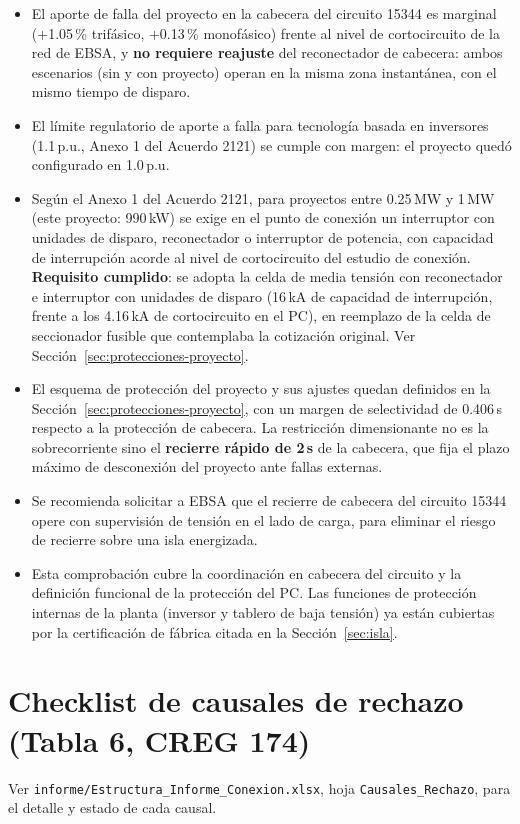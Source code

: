 \documentclass[11pt,a4paper]{article}
\begin{document}
\begin{itemize}
\item El aporte de falla del proyecto en la cabecera del circuito 15344 es marginal (+1.05\,\% trif\'asico, +0.13\,\% monof\'asico) frente al nivel de cortocircuito de la red de EBSA, y \textbf{no requiere reajuste} del reconectador de cabecera: ambos escenarios (sin y con proyecto) operan en la misma zona instant\'anea, con el mismo tiempo de disparo.
\item El l\'imite regulatorio de aporte a falla para tecnolog\'ia basada en inversores (1.1\,p.u., Anexo 1 del Acuerdo 2121) se cumple con margen: el proyecto qued\'o configurado en 1.0\,p.u.
\item Seg\'un el Anexo 1 del Acuerdo 2121, para proyectos entre 0.25\,MW y 1\,MW (este proyecto: 990\,kW) se exige en el punto de conexi\'on un interruptor con unidades de disparo, reconectador o interruptor de potencia, con capacidad de interrupci\'on acorde al nivel de cortocircuito del estudio de conexi\'on. \textbf{Requisito cumplido}: se adopta la celda de media tensi\'on con reconectador e interruptor con unidades de disparo (16\,kA de capacidad de interrupci\'on, frente a los 4.16\,kA de cortocircuito en el PC), en reemplazo de la celda de seccionador fusible que contemplaba la cotizaci\'on original. Ver Secci\'on~\ref{sec:protecciones-proyecto}.
\item El esquema de protecci\'on del proyecto y sus ajustes quedan definidos en la Secci\'on~\ref{sec:protecciones-proyecto}, con un margen de selectividad de 0.406\,s respecto a la protecci\'on de cabecera. La restricci\'on dimensionante no es la sobrecorriente sino el \textbf{recierre r\'apido de 2\,s} de la cabecera, que fija el plazo m\'aximo de desconexi\'on del proyecto ante fallas externas.
\item Se recomienda solicitar a EBSA que el recierre de cabecera del circuito 15344 opere con supervisi\'on de tensi\'on en el lado de carga, para eliminar el riesgo de recierre sobre una isla energizada.
\item Esta comprobaci\'on cubre la coordinaci\'on en cabecera del circuito y la definici\'on funcional de la protecci\'on del PC. Las funciones de protecci\'on internas de la planta (inversor y tablero de baja tensi\'on) ya est\'an cubiertas por la certificaci\'on de f\'abrica citada en la Secci\'on~\ref{sec:isla}.
\end{itemize}

\section{Checklist de causales de rechazo (Tabla 6, CREG 174)}
Ver \texttt{informe/Estructura\_Informe\_Conexion.xlsx}, hoja \texttt{Causales\_Rechazo}, para el detalle y estado de cada causal.
\end{document}
